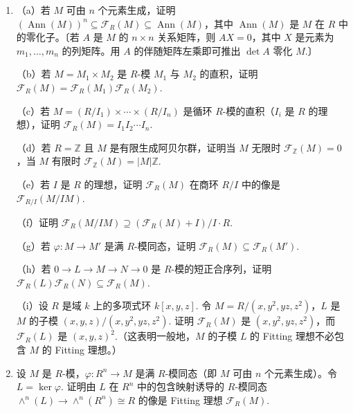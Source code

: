 \begin{enumerate}
（c）证明 \(\mathcal{F}' \subseteq \mathcal{F}\)，并得出 \(\mathcal{F}' = \mathcal{F}\).〔利用上一习题。〕

（d）由（c）推出 \(M\) 的 Fitting 理想 \(\mathcal{F}_R(M)\) 是 \(M\) 的不变量，不依赖于用来计算它的 \(M\) 的生成元的选取。

\noindent 本习题中所有模都假设是有限生成的。

\item （a）若 \(M\) 可由 \(n\) 个元素生成，证明 \((\operatorname{Ann}(M))^n \subseteq \mathcal{F}_R(M) \subseteq \operatorname{Ann}(M)\)，其中 \(\operatorname{Ann}(M)\) 是 \(M\) 在 \(R\) 中的零化子。〔若 \(A\) 是 \(M\) 的 \(n \times n\) 关系矩阵，则 \(AX = 0\)，其中 \(X\) 是元素为 \(m_1, \ldots, m_n\) 的列矩阵。用 \(A\) 的伴随矩阵左乘即可推出 \(\det A\) 零化 \(M\).〕

（b）若 \(M = M_1 \times M_2\) 是 \(R\)-模 \(M_1\) 与 \(M_2\) 的直积，证明 \(\mathcal{F}_R(M) = \mathcal{F}_R(M_1)\mathcal{F}_R(M_2)\).

（c）若 \(M = (R/I_1) \times \cdots \times (R/I_n)\) 是循环 \(R\)-模的直积（\(I_i\) 是 \(R\) 的理想），证明 \(\mathcal{F}_R(M) = I_1I_2\cdots I_n\).

（d）若 \(R = \mathbb{Z}\) 且 \(M\) 是有限生成阿贝尔群，证明当 \(M\) 无限时 \(\mathcal{F}_{\mathbb{Z}}(M) = 0\)，当 \(M\) 有限时 \(\mathcal{F}_{\mathbb{Z}}(M) = |M|\mathbb{Z}\).

（e）若 \(I\) 是 \(R\) 的理想，证明 \(\mathcal{F}_R(M)\) 在商环 \(R/I\) 中的像是 \(\mathcal{F}_{R/I}(M/IM)\).

（f）证明 \(\mathcal{F}_R(M/IM) \supseteq (\mathcal{F}_R(M)+I)/I \cdot R\).

（g）若 \(\varphi : M \to M'\) 是满 \(R\)-模同态，证明 \(\mathcal{F}_R(M) \subseteq \mathcal{F}_R(M')\).

（h）若 \(0 \to L \to M \to N \to 0\) 是 \(R\)-模的短正合序列，证明 \(\mathcal{F}_R(L)\mathcal{F}_R(N) \subseteq \mathcal{F}_R(M)\).

（i）设 \(R\) 是域 \(k\) 上的多项式环 \(k[x,y,z]\). 令 \(M = R/(x, y^2, yz, z^2)\)，\(L\) 是 \(M\) 的子模 \((x,y,z)/(x,y^2,yz,z^2)\). 证明 \(\mathcal{F}_R(M)\) 是 \((x,y^2,yz,z^2)\)，而 \(\mathcal{F}_R(L)\) 是 \((x,y,z)^2\).（这表明一般地，\(M\) 的子模 \(L\) 的 Fitting 理想不必包含 \(M\) 的 Fitting 理想。）

\item 设 \(M\) 是 \(R\)-模，\(\varphi : R^n \to M\) 是满 \(R\)-模同态（即 \(M\) 可由 \(n\) 个元素生成）。令 \(L = \ker\varphi\). 证明由 \(L\) 在 \(R^n\) 中的包含映射诱导的 \(R\)-模同态 \(\wedge^n(L) \to \wedge^n(R^n) \cong R\) 的像是 Fitting 理想 \(\mathcal{F}_R(M)\).


\end{enumerate}
